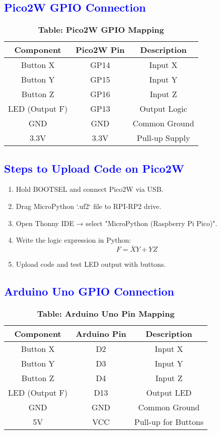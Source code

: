 \documentclass[twocolumn]{article}
\begin{document}
\subsection*{\textcolor{blue}{Pico2W GPIO Connection}}

\begin{table}[h]
\centering
\renewcommand{\arraystretch}{1.3}
\begin{tabular}{|c|c|c|}
\hline
\textbf{Component} & \textbf{Pico2W Pin} & \textbf{Description} \\
\hline
Button X & GP14 & Input X \\
Button Y & GP15 & Input Y \\
Button Z & GP16 & Input Z \\
LED (Output F) & GP13 & Output Logic \\
GND & GND & Common Ground \\
3.3V & 3.3V & Pull-up Supply \\
\hline
\end{tabular}
\caption*{\textbf{Table: Pico2W GPIO Mapping}}
\end{table}

\subsection*{\textcolor{blue}{Steps to Upload Code on Pico2W}}

\begin{enumerate}
    \item Hold BOOTSEL and connect Pico2W via USB.
    \item Drag MicroPython `.uf2` file to RPI-RP2 drive.
    \item Open Thonny IDE → select "MicroPython (Raspberry Pi Pico)".
    \item Write the logic expression in Python:
    \[
    F = \overline{X}Y + YZ
    \]
    \item Upload code and test LED output with buttons.
\end{enumerate}

\subsection*{\textcolor{blue}{Arduino Uno GPIO Connection}}

\begin{table}[h]
\centering
\renewcommand{\arraystretch}{1.3}
\begin{tabular}{|c|c|c|}
\hline
\textbf{Component} & \textbf{Arduino Pin} & \textbf{Description} \\
\hline
Button X & D2 & Input X \\
Button Y & D3 & Input Y \\
Button Z & D4 & Input Z \\
LED (Output F) & D13 & Output LED \\
GND & GND & Common Ground \\
5V & VCC & Pull-up for Buttons \\
\hline
\end{tabular}
\caption*{\textbf{Table: Arduino Uno Pin Mapping}}
\end{table}
\end{document}
